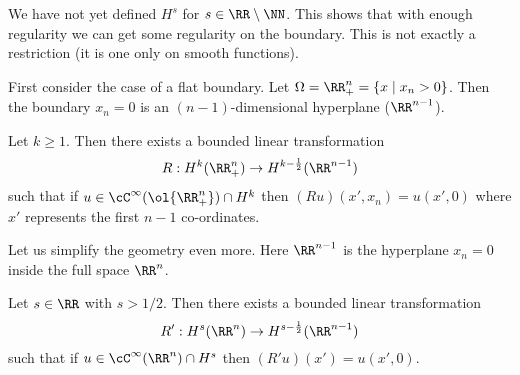 \begin{rmk}
  \lv
  \begin{itm}
    \io We have not yet defined $H^s$ for $s\in\RR\setminus\NN$.
    \io This shows that with enough regularity we can get some regularity on the boundary.
    \io This is not exactly a restriction (it is one only on smooth functions).
  \end{itm}
\end{rmk}

First consider the case of a flat boundary.
Let $\Omega=\RR_+^n=\{x \mid x_n>0\}$.
Then the boundary $x_n=0$ is an $(n-1)$-dimensional hyperplane ($\RR^{n-1}$).

\begin{prop}\label{11:plane}
  Let $k\geq1$.
  Then there exists a bounded linear transformation
  \[ R: H^k(\RR_+^n) \to H^{k-\frac12}(\RR^{n-1}) \]
  such that if $u\in\cC^\infty(\ol{\RR_+^n})\cap H^k$ then $(Ru)(x',x_n)=u(x',0)$ where $x'$ represents the first $n-1$ co-ordinates.
\end{prop}

Let us simplify the geometry even more.
Here $\RR^{n-1}$ is the hyperplane $x_n=0$ inside the full space $\RR^n$.

\begin{prop}\label{11:interior}
  Let $s\in\RR$ with $s>1/2$.
  Then there exists a bounded linear transformation
  \[ R': H^s(\RR^n) \to H^{s-\frac12}(\RR^{n-1}) \]
  such that if $u\in\cC^\infty(\RR^n)\cap H^s$ then $(R'u)(x')=u(x',0)$.
\end{prop}

